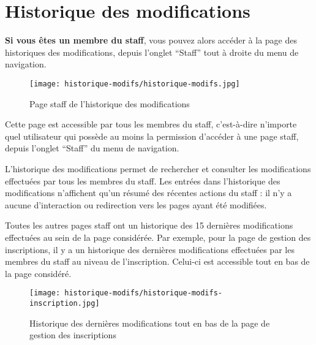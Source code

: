 \section{Historique des modifications}

\textbf{Si vous êtes un membre du staff}, vous pouvez alors accéder à la page des historiques des modifications, depuis l'onglet \enquote{Staff} tout à droite du menu de navigation.

\begin{figure}[H]
\centering
\texttt{[image: historique-modifs/historique-modifs.jpg]}
\caption{Page staff de l'historique des modifications}
\end{figure}

Cette page est accessible par tous les membres du staff, c'est-à-dire n'importe quel utilisateur qui possède au moins la permission d'accéder à une page staff, depuis l'onglet \enquote{Staff} du menu de navigation.\newline

L'historique des modifications permet de rechercher et consulter les modifications effectuées par tous les membres du staff. Les entrées dans l'historique des modifications n'affichent qu'un résumé des récentes actions du staff : il n'y a aucune d'interaction ou redirection vers les pages ayant été modifiées.\newline

Toutes les autres pages staff ont un historique des 15 dernières modifications effectuées au sein de la page considérée. Par exemple, pour la page de gestion des inscriptions, il y a un historique des dernières modifications effectuées par les membres du staff au niveau de l'inscription. Celui-ci est accessible tout en bas de la page considéré.

\begin{figure}[H]
\centering
\texttt{[image: historique-modifs/historique-modifs-inscription.jpg]}
\caption{Historique des dernières modifications tout en bas de la page de gestion des inscriptions}
\end{figure}